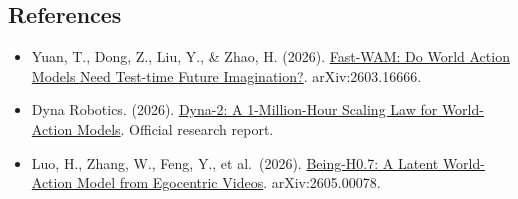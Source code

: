 \FloatBarrier
{}
\hypertarget{references-160}{%
\subsection{References}\label{references-160}}

\vspace{0.25em}
\begin{itemize}
\tightlist
\item
  Yuan, T., Dong, Z., Liu, Y., \& Zhao, H. (2026). \href{https://arxiv.org/abs/2603.16666}{Fast-WAM: Do World Action Models Need Test-time Future Imagination?}. arXiv:2603.16666.
\item
  Dyna Robotics. (2026). \href{https://www.dyna.co/dyna-2}{Dyna-2: A 1-Million-Hour Scaling Law for World-Action Models}. Official research report.
\item
  Luo, H., Zhang, W., Feng, Y., et al.~(2026). \href{https://arxiv.org/abs/2605.00078}{Being-H0.7: A Latent World-Action Model from Egocentric Videos}. arXiv:2605.00078.
\end{itemize}

\clearpage
